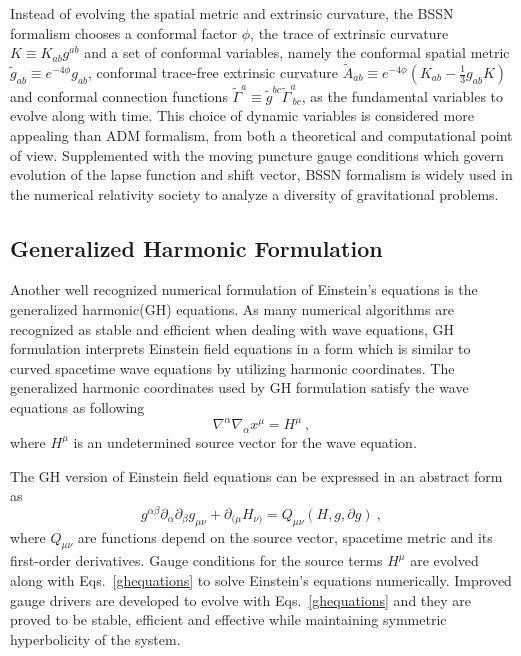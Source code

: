 Instead of evolving the spatial metric and extrinsic curvature, the BSSN formalism chooses a conformal factor $\phi$, the trace of extrinsic curvature $K \equiv K_{ab}g^{ab}$ and a set of conformal variables, namely the conformal spatial metric ${\tilde g}_{ab} \equiv e^{-4\phi}g_{ab}$, conformal trace-free extrinsic curvature ${\tilde A}_{ab} \equiv e^{-4\phi}(K_{ab} - \frac{1}{3}g_{ab}K)$ and conformal connection functions ${\tilde \Gamma}^{a} \equiv {\tilde g}^{bc}{\tilde \Gamma}^{a}_{~bc}$, as the fundamental variables to evolve along with time. This choice of dynamic variables is considered more appealing than ADM formalism, from both a theoretical and computational point of view. Supplemented with the moving puncture gauge conditions which govern evolution of the lapse function and shift vector, BSSN formalism is widely used in the numerical relativity society to analyze a diversity of gravitational problems. 

\subsection{Generalized Harmonic Formulation}
Another well recognized numerical formulation of Einstein's equations is the generalized harmonic(GH) equations\cite{Friedrich:1985, Garfinkle:2001ni, Pretorius:2006tp}. As many numerical algorithms are recognized as stable and efficient when dealing with wave equations, GH formulation interprets Einstein field equations in a form which is similar to curved spacetime wave equations by utilizing harmonic coordinates. The generalized harmonic coordinates used by GH formulation satisfy the wave equations as following
\begin{equation}
	\nabla^{\alpha}\nabla_{\alpha}x^{\mu} = H^{\mu} \ ,
\end{equation}
where $H^{\mu}$ is an undetermined source vector for the wave equation. 

The GH version of Einstein field equations can be expressed in an abstract form as
\begin{equation}\label{ghequations}
	g^{\alpha\beta}\partial_{\alpha}\partial_{\beta}g_{\mu\nu} + \partial_{(\mu}H_{\nu)} = Q_{\mu\nu}(H, g, \partial g) \ , 
\end{equation}
where $Q_{\mu\nu}$ are functions depend on the source vector, spacetime metric and its first-order derivatives. Gauge conditions for the source terms $H^{\mu}$ are evolved along with Eqs.~\ref{ghequations} to solve Einstein's equations numerically. Improved gauge drivers are developed to evolve with Eqs.~\ref{ghequations} and they are proved to be stable, efficient and effective while maintaining symmetric hyperbolicity of the system\cite{Lindblom:2007xw, Lindblom:2009tu}. 

